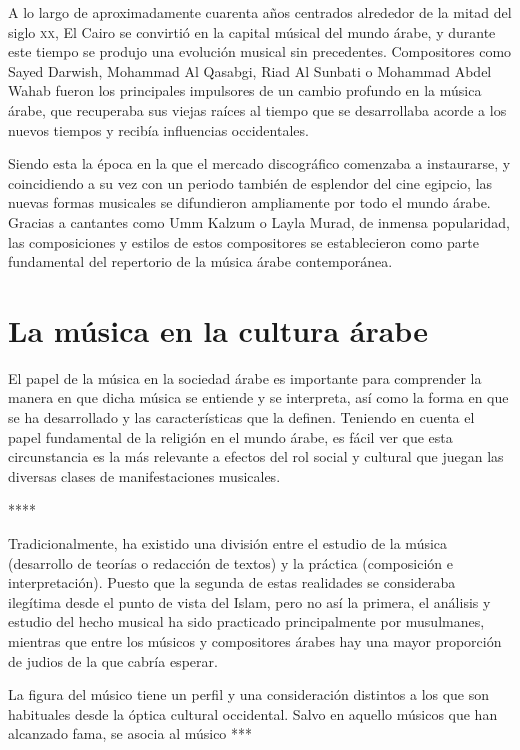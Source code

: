     A lo largo de aproximadamente cuarenta años centrados alrededor de la mitad del siglo \textsc{xx}, El Cairo se convirtió en la capital músical del mundo árabe, y durante este tiempo se produjo una evolución musical sin precedentes. Compositores como Sayed Darwish, Mohammad Al Qasabgi, Riad Al Sunbati o Mohammad Abdel Wahab fueron los principales impulsores de un cambio profundo en la música árabe, que recuperaba sus viejas raíces al tiempo que se desarrollaba acorde a los nuevos tiempos y recibía influencias occidentales.

    Siendo esta la época en la que el mercado discográfico comenzaba a instaurarse, y coincidiendo a su vez con un periodo también de esplendor del cine egipcio, las nuevas formas musicales se difundieron ampliamente por todo el mundo árabe. Gracias a cantantes como Umm Kalzum o Layla Murad, de inmensa popularidad, las composiciones y estilos de estos compositores se establecieron como parte fundamental del repertorio de la música árabe contemporánea.

    \section{La música en la cultura árabe}

    El papel de la música en la sociedad árabe es importante para comprender la manera en que dicha música se entiende y se interpreta, así como la forma en que se ha desarrollado y las características que la definen. Teniendo en cuenta el papel fundamental de la religión en el mundo árabe, es fácil ver que esta circunstancia es la más relevante a efectos del rol social y cultural que juegan las diversas clases de manifestaciones musicales.


    ****

    Tradicionalmente, ha existido una división entre el estudio de la música (desarrollo de teorías o redacción de textos) y la práctica (composición e interpretación). Puesto que la segunda de estas realidades se consideraba ilegítima desde el punto de vista del Islam, pero no así la primera, el análisis y estudio del hecho musical ha sido practicado principalmente por musulmanes, mientras que entre los músicos y compositores árabes hay una mayor proporción de judios de la que cabría esperar.

    La figura del músico tiene un perfil y una consideración distintos a los que son habituales desde la óptica cultural occidental. Salvo en aquello músicos que han alcanzado fama, se asocia al músico ***


